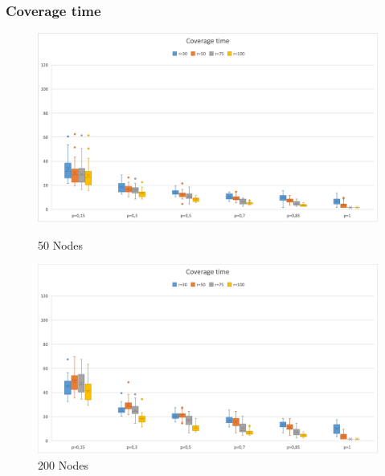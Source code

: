 \subsubsection{Coverage time}
\begin{figure}[H]
  \includegraphics[width=\linewidth]{./images/Time50Boxplot.png}
  \caption{50 Nodes}\label{fig:awesome_image1}
\endminipage\hfill
{}
  \includegraphics[width=\linewidth]{./images/Time200BoxplotScaled.png}
  \caption{200 Nodes}\label{fig:awesome_image2}
\endminipage
\end{figure}

